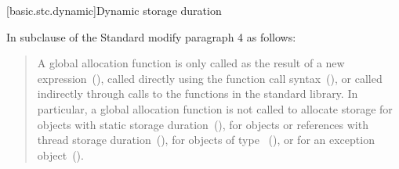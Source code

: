 [basic.stc.dynamic]{Dynamic storage duration}


In subclause  of the \Cpp Standard 
modify paragraph 4 as follows:

\begin{quote}
	\setcounter{Paras}{3}
	\pnum
	A global allocation function is only called as the result of a new
	expression~(),  called directly using the function call
	syntax~(), 
	or called indirectly through calls to the
	functions in the \Cpp standard library. \enternote In particular, a
	global allocation function is not called to allocate storage for objects
	with static storage duration~(), for objects or references
	with thread storage duration~(), for objects of
	type ~(), or for an
	exception object~().
	\exitnote
\end{quote}
